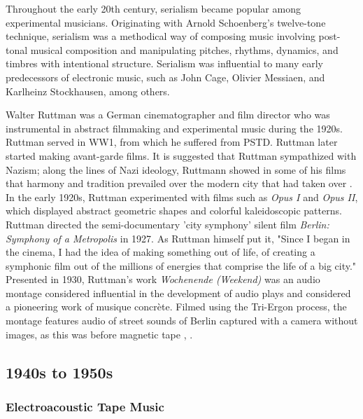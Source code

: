 \documentclass[letterpaper, 12pt]{article}
\begin{document}

%
Throughout the early 20th century, serialism became popular among experimental musicians.
%
Originating with Arnold Schoenberg's twelve-tone technique, serialism was a methodical way of composing music involving post-tonal musical composition and manipulating pitches, rhythms, dynamics, and timbres with intentional structure.
%
Serialism was influential to many early predecessors of electronic music, such as John Cage, Olivier Messiaen, and Karlheinz Stockhausen, among others.


%
Walter Ruttman was a German cinematographer and film director who was instrumental in abstract filmmaking and experimental music during the 1920s. 
%
Ruttman served in WW1, from which he suffered from PSTD. Ruttman later started making avant-garde films.
%
It is suggested that Ruttman sympathized with Nazism; along the lines of Nazi ideology, Ruttmann showed in some of his films that harmony and tradition prevailed over the modern city that had taken over \citep{goergen1989walter}.
%
In the early 1920s, Ruttman experimented with films such as \textit{Opus I} and \textit{Opus II}, which displayed abstract geometric shapes and colorful kaleidoscopic patterns.
%
Ruttman directed the semi-documentary 'city symphony' silent film \textit{Berlin: Symphony of a Metropolis} in 1927. 
%
As Ruttman himself put it, "Since I began in the cinema, I had the idea of making something out of life, of creating a symphonic film out of the millions of energies that comprise the life of a big city." \citep[p. xxx]{dormehl2012journey}
%
Presented in 1930, Ruttman's work \textit{Wochenende (Weekend)} was an audio montage considered influential in the development of audio plays and considered a pioneering work of musique concrète.
%
Filmed using the Tri-Ergon process, the montage features audio of street sounds of Berlin captured with a camera without images, as this was before magnetic tape  \citep{williams2017concrete}, \citep{segel2002transparent}.

\subsection{1940s to 1950s}

\subsubsection{Electroacoustic Tape Music}
\end{document}
